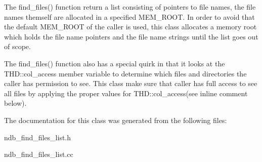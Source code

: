 The find\+\_\+files() function return a list consisting of pointers to file names, the file names themself are allocated in a specified M\+E\+M\+\_\+\+R\+O\+OT. In order to avoid that the default M\+E\+M\+\_\+\+R\+O\+OT of the caller is used, this class allocates a memory root which holds the file name pointers and the file name strings until the list goes out of scope.

The find\+\_\+files() function also has a special quirk in that it looks at the T\+H\+D\+::col\+\_\+access member variable to determine which files and directories the caller has permission to see. This class make sure that caller has full access to see all files by applying the proper values for T\+H\+D\+::col\+\_\+access(see inline comment below). 

The documentation for this class was generated from the following files\+:\begin{DoxyCompactItemize}
\item 
ndb\+\_\+find\+\_\+files\+\_\+list.\+h\item 
ndb\+\_\+find\+\_\+files\+\_\+list.\+cc\end{DoxyCompactItemize}
